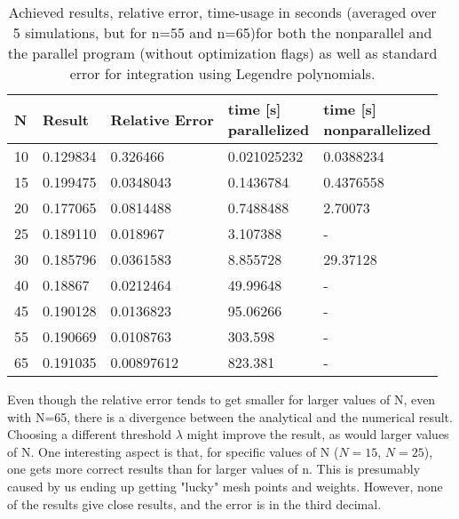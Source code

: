 \documentclass[10pt,a4paper]{article}
\begin{document}
\begin{table}[H]
\caption[Cartesian Quadrature using Legendre polynomials]{Achieved results, relative error, time-usage in seconds (averaged over 5 simulations, but for n=55 and n=65)for both the nonparallel and the parallel program (without optimization flags) as well as standard error for integration using Legendre polynomials. }
\begin{tabular}{|l|l|l|l|l|}
\hline
N          & Result   & Relative Error & \pbox{10cm}{time {[}s{]}\\ parallelized}  &  \pbox{10cm}{time {[}s{]}\\ nonparallelized} \\ \hline
10 & 0.129834 & 0.326466       & 0.021025232                             & 0.0388234 \\ \hline
15 & 0.199475 & 0.0348043      & 0.1436784                               & 0.4376558 \\ \hline
20 & 0.177065 & 0.0814488      & 0.7488488                               & 2.70073   \\ \hline
25 & 0.189110  & 0.018967       & 3.107388                                & -       \\ \hline
30 & 0.185796 & 0.0361583      & 8.855728                                & 29.37128  \\ \hline
40 & 0.18867  & 0.0212464      & 49.99648                                & -       \\ \hline
45 & 0.190128 & 0.0136823      & 95.06266                                & -       \\ \hline
55 & 0.190669 & 0.0108763      & 303.598                                 & -       \\ \hline
65 & 0.191035 & 0.00897612     & 823.381                                 & -       \\ \hline
\end{tabular}
\end{table}

Even though the relative error tends to get smaller for larger values of N, even with N=65, there is a divergence between the analytical and the numerical result. Choosing a different threshold $\lambda$ might improve the result, as would larger values of N. One interesting aspect is that, for specific values of N ($N=15$, $N=25$), one gets more correct results than for larger values of n. This is presumably caused by us ending up getting "lucky" mesh points and weights. However, none of the results give close results, and the error is in the third decimal.
\end{document}
